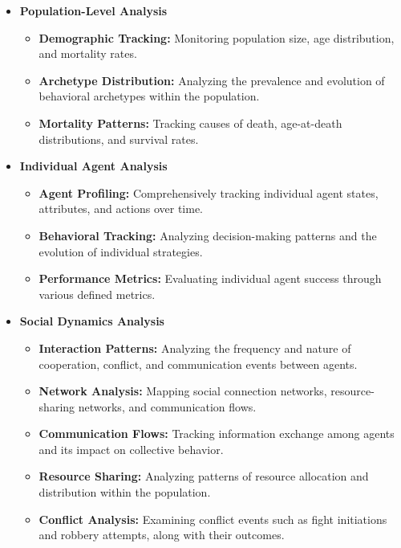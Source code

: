 \begin{itemize}
    \item \textbf{Population-Level Analysis}
    \begin{itemize}
        \item \textbf{Demographic Tracking:} Monitoring population size, age distribution, and mortality rates.
        \item \textbf{Archetype Distribution:} Analyzing the prevalence and evolution of behavioral archetypes within the population.
        \item \textbf{Mortality Patterns:} Tracking causes of death, age-at-death distributions, and survival rates.
    \end{itemize}

    \item \textbf{Individual Agent Analysis}
    \begin{itemize}
        \item \textbf{Agent Profiling:} Comprehensively tracking individual agent states, attributes, and actions over time.
        \item \textbf{Behavioral Tracking:} Analyzing decision-making patterns and the evolution of individual strategies.
        \item \textbf{Performance Metrics:} Evaluating individual agent success through various defined metrics.
    \end{itemize}

    \item \textbf{Social Dynamics Analysis}
    \begin{itemize}
        \item \textbf{Interaction Patterns:} Analyzing the frequency and nature of cooperation, conflict, and communication events between agents.
        \item \textbf{Network Analysis:} Mapping social connection networks, resource-sharing networks, and communication flows.
        \item \textbf{Communication Flows:} Tracking information exchange among agents and its impact on collective behavior.
        \item \textbf{Resource Sharing:} Analyzing patterns of resource allocation and distribution within the population.
        \item \textbf{Conflict Analysis:} Examining conflict events such as fight initiations and robbery attempts, along with their outcomes.
    \end{itemize}


\end{itemize}
